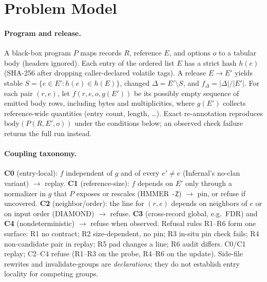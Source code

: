 \section{Problem Model}
\label{sec:model}

\paragraph{Program and release.}
A black-box program $P$ maps records $R$, reference $E$, and options $o$ to a
tabular body (headers ignored). Each entry of the ordered list $E$ has a strict
hash $h(e)$ (SHA-256 after dropping caller-declared volatile tags). A release
$E\!\to\!E'$ yields stable $S=\{e\in E':h(e)\in h(E)\}$, changed
$\Delta=E'\setminus S$, and $f_\Delta=|\Delta|/|E'|$.
For each pair $(r,e)$, let $f(r,e,o,g(E'))$ be its possibly empty sequence
of emitted body rows, including bytes and multiplicities, where $g(E')$
collects reference-wide quantities (entry count, length, \ldots).
Exact re-annotation reproduces $\mathrm{body}(P(R,E',o))$ under the
conditions below; an observed check failure returns the full run instead.

\paragraph{Coupling taxonomy.}
\textbf{C0} (entry-local): $f$ independent of $g$ and of every $e'\neq e$
(Infernal's no-clan variant) $\rightarrow$ replay.
\textbf{C1} (reference-size): $f$ depends on $E'$ only through a normalizer in
$g$ that $P$ exposes or \sys rescales (HMMER \texttt{-Z}) $\rightarrow$ pin, or
refuse if uncovered.
\textbf{C2} (neighbor/order): the line for $(r,e)$ depends on neighbors of $e$
or on input order (DIAMOND) $\rightarrow$ refuse.
\textbf{C3} (cross-record global, e.g.\ FDR) and \textbf{C4} (nondeterministic)
$\rightarrow$ refuse when observed.
Refusal rules R1--R6 form one surface: R1 no contract; R2 size-dependent, no
pin; R3 in-situ pin check fails; R4 non-candidate pair in replay; R5 pad changes
a line; R6 audit differs. C0/C1 replay; C2--C4 refuse (R1--R3 on the probe,
R4--R6 on the update). Side-file rewrites and invalidate-groups are
\textit{declarations}; they do not establish entry locality for competing groups.

